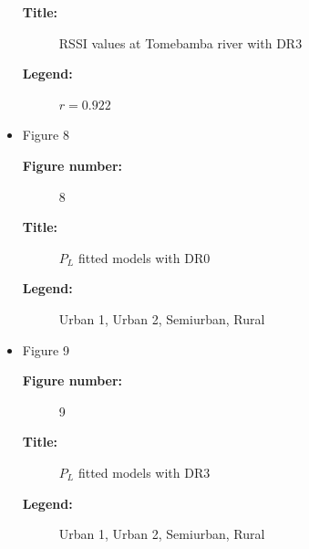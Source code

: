 \begin{itemize}
\begin{description}
  \item [\textbf{Title:}] RSSI values at Tomebamba river with DR$3$
  \item [\textbf{Legend:}] $r=0.922$
  \end{description}
\item Figure 8
  \begin{description}
  \item [\textbf{Figure number:}] 8
  \item [\textbf{Title:}] $P_L$ fitted models with DR$0$
  \item [\textbf{Legend:}] Urban 1, Urban 2, Semiurban, Rural
  \end{description}
\item Figure 9
  \begin{description}
  \item [\textbf{Figure number:}] 9
  \item [\textbf{Title:}] $P_L$ fitted models with DR$3$
  \item [\textbf{Legend:}] Urban 1, Urban 2, Semiurban, Rural
  \end{description}
\end{itemize}




